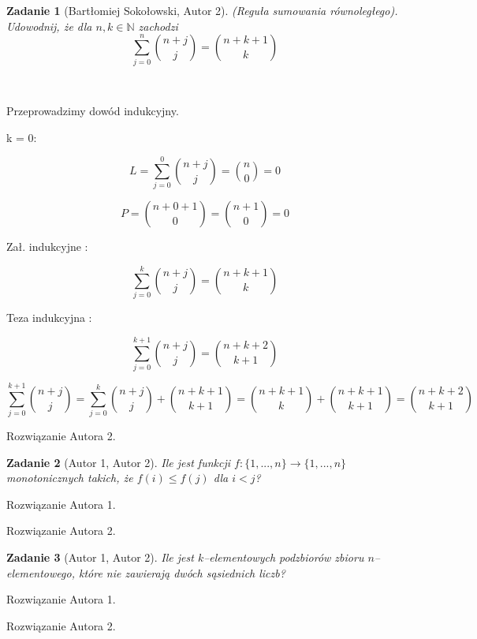\documentclass{mwart}
\newtheorem{zad}{Zadanie}[section]
\begin{document}
\begin{zad}[Bartłomiej Sokołowski, Autor 2]
    (Reguła sumowania równoległego). Udowodnij, że dla $n, k \in \mathbb{N}$
    zachodzi \[ \sum_{j= 0}^{n}\binom{n+j}{j} = \binom{n+k+1}{k}   \]
\end{zad}\
\begin{mdframed}
    Przeprowadzimy dowód indukcyjny. 
    \item k = 0:
    \item \[ L = \sum_{j=0}^{0}\binom{n+j}{j} = \binom{n}{0} = 0 \] 
    \item \[P = \binom{n+0+1}{0} = \binom{n+1}{0} = 0\]
    \item Zał. indukcyjne :
    \item \[\sum_{j=0}^{k}\binom{n+j}{j} = \binom{n+k+1}{k}\]
    \item Teza indukcyjna :
    \item \[\sum_{j=0}^{k+1}\binom{n+j}{j} = \binom{n+k+2}{k+1}\]
    \item \[\sum_{j=0}^{k+1}\binom{n+j}{j} = \sum_{j=0}^{k}\binom{n+j}{j} + \binom{n+k+1}{k+1} = \binom{n+k+1}{k} + \binom{n+k+1}{k+1} = \binom{n+k+2}{k+1}\]
\end{mdframed}
\begin{mdframed}
    Rozwiązanie Autora 2.
\end{mdframed}



\begin{zad}[Autor 1, Autor 2]
    Ile jest funkcji $f:\{1, ..., n\} \to \{1, ..., n\}$ monotonicznych takich,
    że $f(i) \leq f(j) $ dla $i < j$?
\end{zad}
\begin{mdframed}
    Rozwiązanie Autora 1.
\end{mdframed}
\begin{mdframed}
    Rozwiązanie Autora 2.
\end{mdframed}




\begin{zad}[Autor 1, Autor 2]
    Ile jest $k$--elementowych podzbiorów zbioru $n$--elementowego, które nie
    zawierają dwóch sąsiednich liczb?
\end{zad}
\begin{mdframed}
    Rozwiązanie Autora 1.
\end{mdframed}
\begin{mdframed}
    Rozwiązanie Autora 2.
\end{mdframed}
\end{document}
